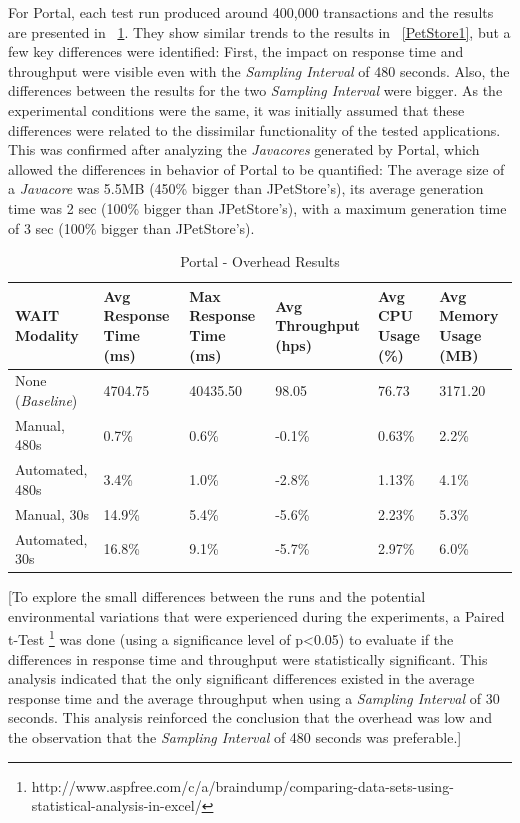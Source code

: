 \documentclass[runningheads,a4paper]{llncs}
\begin{document}
For Portal, each test run produced around 400,000 transactions and the
results are presented in \tablename ~\ref{Portal1}. They show similar trends
to the results in \tablename ~\ref{PetStore1}, but a few
key differences were identified: First, the impact on response time and
throughput were visible even with the \emph{Sampling Interval} of 480 seconds.
Also, the differences between the results for the two \emph{Sampling Interval}
were bigger. As the experimental conditions were the same, it was initially
assumed that these differences were related to the dissimilar functionality of the 
tested applications. This was confirmed after analyzing the \emph{Javacores} generated 
by Portal, which allowed the differences in behavior of Portal to be quantified:
The average size of a \emph{Javacore} was 5.5MB (450\% bigger than JPetStore's), its 
average generation time was 2 sec (100\% bigger than JPetStore's), with a maximum 
generation time of 3 sec (100\% bigger than JPetStore's).

\begin{table}[!h]
\caption{Portal - Overhead Results}
\label{Portal1}
\centering
\begin{tabular}{p{}|p{}|p{}|p{}|p{}|p{}}
\hline
\bfseries WAIT Modality & \bfseries Avg Response Time (ms)& \bfseries Max
Response Time (ms)& \bfseries Avg Throughput (hps)& \bfseries Avg CPU Usage
(\%) & \bfseries Avg Memory Usage (MB)\\
\hline
None (\emph{Baseline}) 	& 4704.75	& 40435.50	& 98.05 	& 76.73 	& 3171.20\\
Manual, 480s 			& 0.7\% 	& 0.6\%		& -0.1\%	& 0.63\% 	& 2.2\%\\
Automated, 480s 		& 3.4\%		& 1.0\%		& -2.8\% 	& 1.13\% 	& 4.1\%\\
Manual, 30s 			& 14.9\%	& 5.4\%		& -5.6\% 	& 2.23\% 	& 5.3\%\\
Automated, 30s 			& 16.8\%	& 9.1\%		& -5.7\% 	& 2.97\% 	& 6.0\%\\
\hline
\end{tabular}
\end{table}

[To explore the small differences between the runs and the potential
environmental variations that were experienced during the experiments, a Paired
t-Test
\footnote{http://www.aspfree.com/c/a/braindump/comparing-data-sets-using-statistical-analysis-in-excel/}
 was done (using a significance level of p\textless0.05) to evaluate if the
differences in response time and throughput were statistically significant.
This analysis indicated that the only significant differences existed in the
 average response time and the average throughput when using a \emph{Sampling Interval} of 30 seconds.
This analysis reinforced the conclusion that the overhead was low and the
observation that the \emph{Sampling Interval} of 480 seconds was preferable.]
\end{document}
